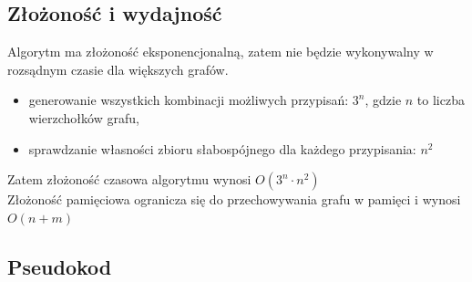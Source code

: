 \subsection{Złożoność i wydajność}

Algorytm ma złożoność eksponencjonalną, zatem nie będzie wykonywalny w rozsądnym czasie dla większych grafów.
\begin{itemize}
    \item generowanie wszystkich kombinacji możliwych przypisań: $3^n$, gdzie $n$ to liczba wierzchołków grafu,
    \item sprawdzanie własności zbioru słabospójnego dla każdego przypisania: $n^2$
\end{itemize}

Zatem złożoność czasowa algorytmu wynosi $O(3^n \cdot n^2)$\\
Złożoność pamięciowa ogranicza się do przechowywania grafu w pamięci i wynosi $O(n + m)$

\subsection{Pseudokod}

